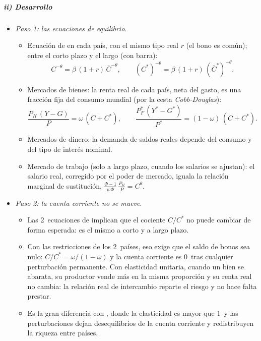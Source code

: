 \documentclass[11pt]{article}
\begin{document}
\subparagraph{ii) Desarrollo}

\begin{itemize}
\item \emph{Paso 1: las ecuaciones de equilibrio}.
  \begin{itemize}
  \item Ecuación de  en cada país, con el mismo tipo real $r$ (el bono es común); entre el corto plazo y el largo (con barra):
    \begin{equation*}
    C^{-\theta}=\beta\,(1+r)\,\overline{C}^{-\theta},\qquad (C^*)^{-\theta}=\beta\,(1+r)\,(\overline{C}^*)^{-\theta}.
    \end{equation*}
  \item Mercados de bienes: la renta real de cada país, neta del gasto, es una fracción fija del consumo mundial (por la cesta \emph{Cobb-Douglas}):
    \begin{equation*}
    \frac{P_H\,(Y-G)}{P}=\omega\,(C+C^*),\qquad \frac{P^*_F\,(Y^*-G^*)}{P^*}=(1-\omega)\,(C+C^*).
    \end{equation*}
  \item Mercados de dinero: la demanda de saldos reales depende del consumo y del tipo de interés nominal.
  \item Mercado de trabajo (solo a largo plazo, cuando los salarios se ajustan): el salario real, corregido por el poder de mercado, iguala la relación marginal de sustitución, $\frac{\Phi-1}{\kappa\,\Phi}\,\frac{P_H}{P}=C^{\theta}$.
  \end{itemize}
\item \emph{Paso 2: la cuenta corriente no se mueve}.
  \begin{itemize}
  \item Las 2~ecuaciones de  implican que el cociente $C/C^*$ no puede cambiar de forma esperada: es el mismo a corto y a largo plazo.
  \item Con las restricciones de los 2~países, eso exige que el saldo de bonos sea nulo: $C/C^*=\omega/(1-\omega)$ y la cuenta corriente es 0~tras cualquier perturbación permanente. Con elasticidad unitaria, cuando un bien se abarata, su productor vende más en la misma proporción y su renta real no cambia: la relación real de intercambio reparte el riesgo y no hace falta prestar.
  \item Es la gran diferencia con \textcite{ObstfeldRogoff1995Redux}, donde la elasticidad es mayor que 1~y las perturbaciones dejan desequilibrios de la cuenta corriente y redistribuyen la riqueza entre países.
  \end{itemize}

\end{itemize}
\end{document}
